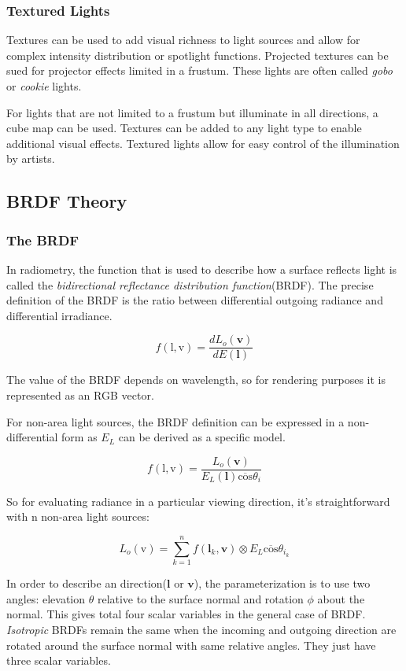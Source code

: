 \documentclass[10pt, a4paper]{article}
\begin{document}
        \subsubsection{Textured Lights}
            Textures can be used to add  visual richness to light sources and allow for complex intensity distribution or spotlight functions. Projected textures can be sued for projector effects limited in a frustum. These lights are often called \emph{gobo} or \emph{cookie} lights.  
            
            For lights that are not limited to a frustum but illuminate in all directions, a cube map can be used. Textures can be added to any light type to enable additional visual effects. Textured lights allow for easy control of the illumination by artists. 
    \subsection{BRDF Theory}
        \subsubsection{The BRDF}
            In radiometry, the function that is used to describe how a surface reflects light is called the \emph{bidirectional reflectance distribution function}(BRDF).  The precise definition of the BRDF is the ratio between differential outgoing radiance and differential irradiance. 

            $$f(\text{l}, \text{v}) = \frac{dL_o(\textbf{v})}{dE(\textbf{l})}$$

            The value of the BRDF depends on wavelength, so for rendering purposes it is represented as an RGB vector. 

            For non-area light sources, the BRDF definition can be expressed in a non-differential form as $E_L$ can be derived as a specific model. 

            $$f(\text{l}, \text{v}) = \frac{L_o(\textbf{v})}{E_L(\textbf{l})\overline{\text{cos}}\theta_i}$$

            So for evaluating radiance in a particular viewing direction, it's straightforward with n non-area light sources: 

            $$L_o(\text{v}) = \sum_{k = 1}^{n}f(\textbf{l}_k, \textbf{v}) \otimes E_L\overline{\text{cos}}\theta_{i_k}$$

            In order to describe an direction($\textbf{l}$ or $\textbf{v}$), the parameterization is to use two angles: elevation $\theta$ relative to the surface normal and rotation $\phi$ about the normal. This gives total four scalar variables in the general case of BRDF. \emph{Isotropic} BRDFs remain the same when the incoming and outgoing direction are rotated around the surface normal with same relative angles. They just have three scalar variables. 
\end{document}
